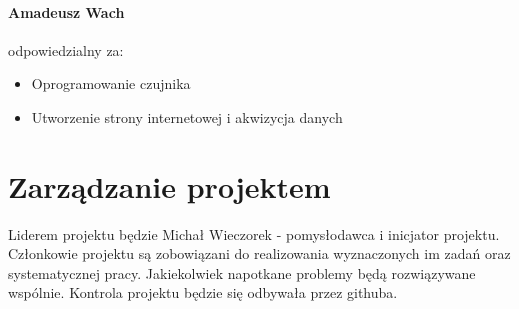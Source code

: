 \documentclass[12pt]{article}
\begin{document}
\paragraph{Amadeusz Wach} odpowiedzialny za:
\begin{itemize}
\item Oprogramowanie czujnika
\item Utworzenie strony internetowej i akwizycja danych
\end{itemize}

\section{Zarządzanie projektem}
Liderem projektu będzie Michał Wieczorek - pomysłodawca i inicjator projektu. Członkowie projektu są zobowiązani do realizowania wyznaczonych im zadań oraz systematycznej pracy. Jakiekolwiek napotkane problemy będą rozwiązywane wspólnie. Kontrola projektu będzie się odbywała przez githuba.
 
\end{document}
